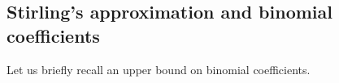 
\subsection{Stirling's approximation and binomial coefficients}
Let us briefly recall an upper bound on binomial coefficients.

